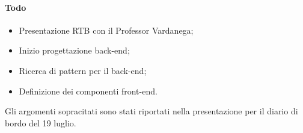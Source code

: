\paragraph{Todo}
\begin{itemize}
	\item Presentazione RTB con il Professor Vardanega;
	\item Inizio progettazione back-end;
	\item Ricerca di pattern per il back-end;
	\item Definizione dei componenti front-end.
\end{itemize}

\vspace{0.5\baselineskip}
\par Gli argomenti sopracitati sono stati riportati nella presentazione per il diario di bordo del 19 luglio.